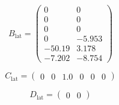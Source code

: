 \documentclass[lettersize,journal]{IEEEtran}
\begin{document}
{\begin{equation}
B_{\mathrm{lat}}=\left(\begin{array}{cc} 0 & 0\\ 0 & 0\\ 0 & 0\\ 0 & -5.953\\ -50.19 & 3.178\\ -7.202 & -8.754 \end{array}\right)
\end{equation}

\begin{equation}
C_{\mathrm{lat}}=\left(\begin{array}{cccccc} 0 & 0 & 1.0 & 0 & 0 & 0 \end{array}\right)
\end{equation}

\begin{equation}
D_{\mathrm{lat}}=\left(\begin{array}{cc} 0 & 0 \end{array}\right)
\end{equation}

}
\end{document}
